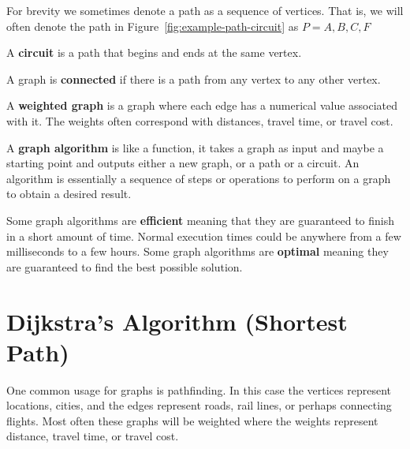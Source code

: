 \begin{note}
  For brevity we sometimes denote a path as a sequence of vertices.
  That is, we will often denote the path in
  Figure~\ref{fig:example-path-circuit} as \(P=A,B,C,F\)
\end{note}

\begin{definition}
  A \textbf{circuit} is a path that begins and ends at the same
  vertex.
\end{definition}

\newpage

\begin{definition}
  A graph is \textbf{connected} if there is a path from any vertex to
  any other vertex.
\end{definition}

\begin{definition}
  A \textbf{weighted graph} is a graph where each edge has a numerical
  value associated with it. The weights often correspond with
  distances, travel time, or travel cost.
\end{definition}

\begin{definition}
  A \textbf{graph algorithm} is like a function, it takes a graph as
  input and maybe a starting point and outputs either a new graph, or
  a path or a circuit. An algorithm is essentially a sequence of steps
  or operations to perform on a graph to obtain a desired result.

  Some graph algorithms are \textbf{efficient} meaning that they are
  guaranteed to finish in a short amount of time. Normal execution
  times could be anywhere from a few milliseconds to a few hours. Some
  graph algorithms are \textbf{optimal} meaning they are guaranteed to
  find the best possible solution.
\end{definition}

\section{Dijkstra's Algorithm (Shortest Path)}%
\label{sec:dijkstras-algorithm}

One common usage for graphs is pathfinding. In this case the vertices
represent locations, \eg{} cities, and the edges represent roads, rail
lines, or perhaps connecting flights. Most often these graphs will be
weighted where the weights represent distance, travel time, or travel
cost.

